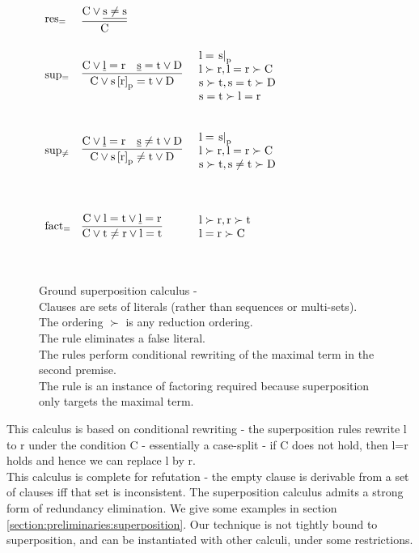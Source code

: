 \begin{figure}
$
\begin{array}[c]{llll}
\\
\vspace{10pt}
\mathrm{res_{=}} &\vcenter{\infer[]{\m{C       }                               }{\m{C \lor \underline{s\neq s}}                   }} & 
\\
\vspace{10pt}
\mathrm{sup_{=}} &\vcenter{
	\infer[]
		{\m{C \lor \termRepAt{s}{r}{p} = t \lor D}}
		{
			\m{C \lor \underline{l}=r} & 
			\m{\underline{s} = t \lor D}
		}
	} & 
\parbox[c][2cm]{3cm}{\m{l = \termAt{s}{p}}\\\m{l \succ r,l=r \succ C}\\\m{s \succ t,s=t \succ D}\\\m{s=t \succ l=r}}\\
\vspace{10pt}
\mathrm{sup_{\neq}} &\vcenter{
	\infer[]
		{\m{C \lor \termRepAt{s}{r}{p} \neq t \lor D}}
		{
			\m{C \lor \underline{l}=r} & 
			\m{\underline{s} \neq t \lor D}
		}
} & 
\parbox[c][2cm]{3cm}{\m{l = \termAt{s}{p}}\\\m{l \succ r,l=r \succ C}\\\m{s \succ t,s \neq t \succ D}}\\
\vspace{10pt}
\mathrm{fact_{=}} & \vcenter{
	\infer[]
	{\m{C \lor t \neq r \lor l = t}}
	{\m{C \lor l=t      \lor \underline{l} = r}}
}
	& 
\parbox[c][2cm]{3cm}{\m{l \succ r,r \succ t}\\\m{l=r \succ C}}\\
\end{array}
$
\caption{Ground superposition calculus - \SPG\\
Clauses are sets of literals (rather than sequences or multi-sets).\\
The ordering $\succ$ is any reduction ordering.\\
The rule  eliminates a false literal.\\
The rules  perform conditional rewriting of the maximal term in the second premise.\\
The rule  is an instance of factoring required because superposition only targets the maximal term.
}
\label{superposition_calculus.1}
\end{figure}

This calculus is based on conditional rewriting - the superposition rules rewrite l to r under the condition C - essentially a case-split - if C does not hold, then l=r holds and hence we can replace l by r. \\
This calculus is complete for refutation - the empty clause is derivable from a set of clauses iff that set is inconsistent.
The superposition calculus admits a strong form of redundancy elimination.
We give some examples in section \ref{section:preliminaries:superposition}.
Our technique is not tightly bound to superposition, and can be instantiated with other calculi, under some restrictions. 

